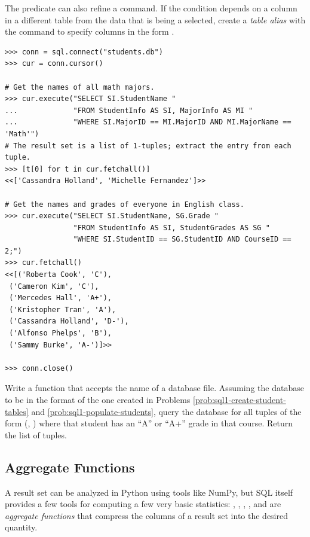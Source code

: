 The  predicate can also refine a  command.
If the condition depends on a column in a different table from the data that is being a selected, create a \emph{table alias} with the  command to specify columns in the form .

\begin{lstlisting}
>>> conn = sql.connect("students.db")
>>> cur = conn.cursor()

# Get the names of all math majors.
>>> cur.execute("SELECT SI.StudentName "
...             "FROM StudentInfo AS SI, MajorInfo AS MI "
...             "WHERE SI.MajorID == MI.MajorID AND MI.MajorName == 'Math'")
# The result set is a list of 1-tuples; extract the entry from each tuple.
>>> [t[0] for t in cur.fetchall()]
<<['Cassandra Holland', 'Michelle Fernandez']>>

# Get the names and grades of everyone in English class.
>>> cur.execute("SELECT SI.StudentName, SG.Grade "
                "FROM StudentInfo AS SI, StudentGrades AS SG "
                "WHERE SI.StudentID == SG.StudentID AND CourseID == 2;")
>>> cur.fetchall()
<<[('Roberta Cook', 'C'),
 ('Cameron Kim', 'C'),
 ('Mercedes Hall', 'A+'),
 ('Kristopher Tran', 'A'),
 ('Cassandra Holland', 'D-'),
 ('Alfonso Phelps', 'B'),
 ('Sammy Burke', 'A-')]>>

>>> conn.close()
\end{lstlisting}

\begin{problem} %
Write a function that accepts the name of a database file.
Assuming the database to be in the format of the one created in Problems \ref{prob:sql1-create-student-tables} and \ref{prob:sql1-populate-students}, query the database for all tuples of the form (, ) where that student has an ``A'' or ``A+'' grade in that course.
Return the list of tuples.
\end{problem}

\subsection*{Aggregate Functions} %

A result set can be analyzed in Python using tools like NumPy, but SQL itself provides a few tools for computing a few very basic statistics: , , , , and  are \emph{aggregate functions} that compress the columns of a result set into the desired quantity.

